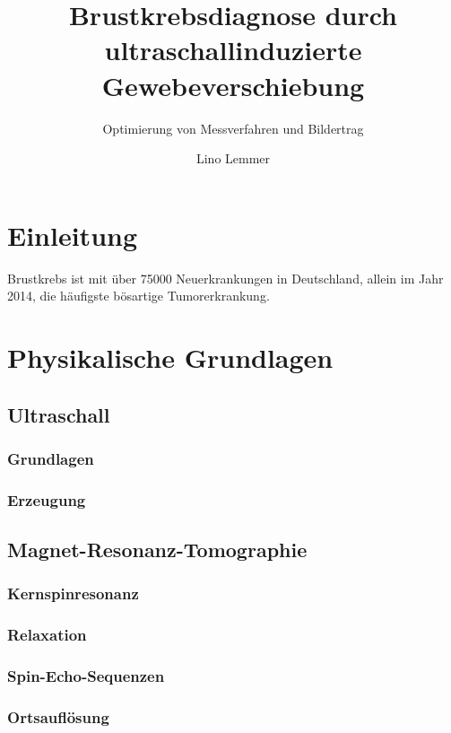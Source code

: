 \documentclass[
    11pt,
    ngerman
]{scrreprt}
\author{Lino Lemmer}
\title{Brustkrebsdiagnose durch ultraschallinduzierte Gewebeverschiebung}
\subtitle{Optimierung von Messverfahren und Bildertrag}
\begin{document}
\maketitle


\tableofcontents

\chapter{Einleitung}

Brustkrebs ist mit über 75000 Neuerkrankungen in Deutschland, allein im Jahr 2014, die häufigste bösartige Tumorerkrankung.

\chapter{Physikalische Grundlagen}

\section{Ultraschall}

\subsection{Grundlagen}

\subsection{Erzeugung}

\section{Magnet-Resonanz-Tomographie}

\subsection{Kernspinresonanz}

\subsection{Relaxation}

\subsection{Spin-Echo-Sequenzen}

\subsection{Ortsauflösung}
\end{document}
